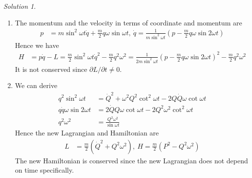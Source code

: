 \documentclass[twoside,11pt]{article}
\theoremstyle{definition}
\theoremstyle{remark}
\newtheorem*{solution}{Solution}
\begin{document}
\begin{solution}~
\begin{enumerate}[label=\alph*)]
\item The momentum and the velocity in terms of coordinate and momentum are
\begin{align*}
    p &= m\sin^2\omega t\dot q + \frac{m}{2}q\omega\sin\omega t,~
    \dot q = \frac{1}{m\sin^2\omega t}\left(p - \frac{m}{2}q\omega\sin 2\omega t\right)
\end{align*}
Hence we have
\begin{align*}
    H &= p\dot q - L
    = \frac{m}{2}\sin^2\omega t\dot q^2 - \frac{m}{2}q^2\omega^2
    = \frac{1}{2m\sin^2\omega t}\left( 
        p - \frac{m}{2}q\omega\sin 2\omega t
    \right)^2 - \frac{m}{2}q^2\omega^2
\end{align*}
It is not conserved since $\partial L/\partial t\neq 0$.


\item We can derive
\begin{align*}
    q^2\sin^2\omega t &= \dot Q^2 + \omega^2Q^2\cot^2\omega t - 2Q\dot Q\omega
    \cot\omega t\\
    q\dot q\omega\sin2\omega t &= 
    2\dot QQ\omega\cot\omega t - 2Q^2\omega^2\cot^2\omega t\\
    q^2\omega^2 &= \frac{Q^2\omega^2}{\sin\omega t}
\end{align*}
Hence the new Lagrangian and Hamiltonian are
\begin{align*}
    L &= \frac{m}{2}(\dot Q^2 + Q^2\omega^2),~
    H  = \frac{m}{2}(P^2 - Q^2\omega^2)
\end{align*}
The new Hamiltonian is conserved since the new Lagrangian does not depend on time specifically.

\end{enumerate}
\end{solution}

\end{document}
